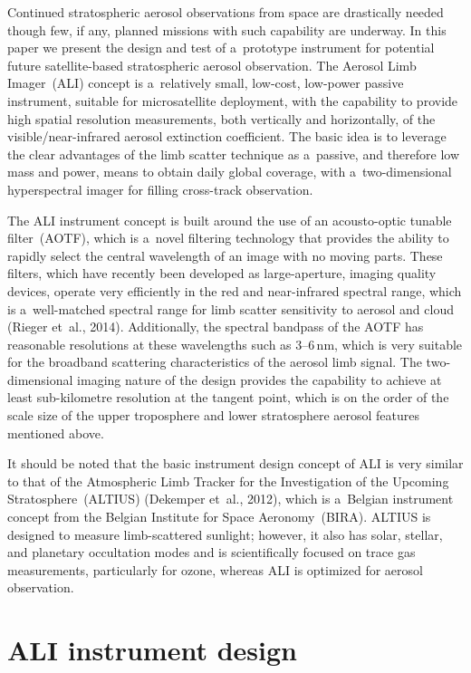 \documentclass[amt]{copernicus}
\begin{document}
Continued stratospheric aerosol observations from space are
drastically needed though few, if any, planned missions with such
capability are underway. In this paper we present the design and test
of a~prototype instrument for potential future satellite-based
stratospheric aerosol observation. The Aerosol Limb Imager~(ALI)
concept is a~relatively small, low-cost, low-power passive
instrument, suitable for microsatellite deployment, with the
capability to provide high spatial resolution measurements, both
vertically and horizontally, of the visible/near-infrared aerosol extinction
coefficient. The basic idea is to leverage the clear advantages of the
limb scatter technique as a~passive, and therefore low mass and power,
means to obtain daily global coverage, with a~two-dimensional
hyperspectral imager for filling cross-track observation.

The ALI instrument concept is built around the use of an acousto-optic
tunable filter~(AOTF), which is a~novel filtering technology that
provides the ability to rapidly select the central wavelength of an
image with no moving parts. These filters, which have recently been
developed as large-aperture, imaging quality devices, operate very
efficiently in the red and near-infrared spectral range, which is
a~well-matched spectral range for limb scatter sensitivity to aerosol
and cloud (Rieger et~al., 2014).  Additionally, the spectral bandpass
of the AOTF has reasonable resolutions at these
wavelengths such as 3--6\,\unit{nm}, which is very suitable for the broadband scattering
characteristics of the aerosol limb signal. The two-dimensional
imaging nature of the design provides the capability to achieve at
least sub-kilometre resolution at the tangent point, which is on the
order of the scale size of the upper troposphere and lower
stratosphere aerosol features mentioned above.

It should be noted that the basic instrument design concept of ALI is
very similar to that of the Atmospheric Limb Tracker for the
Investigation of the Upcoming Stratosphere~(ALTIUS) (Dekemper et~al.,
2012), which is a~Belgian instrument concept from the Belgian
Institute for Space Aeronomy~(BIRA).  ALTIUS is designed to measure
limb-scattered sunlight; however, it also has solar, stellar, and
planetary occultation modes and is scientifically focused on trace gas
measurements, particularly for ozone, whereas ALI is optimized for
aerosol observation.\hack{\vspace{-3mm}}

\section{ALI instrument design}
\end{document}
